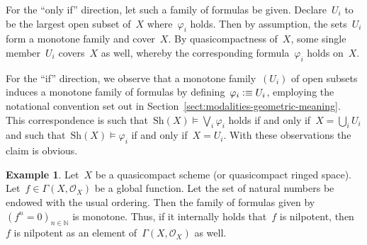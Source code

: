 \documentclass[10pt,reqno,a4paper]{amsbook}
\makeatletter
\theoremstyle{definition}
\newtheorem{ex}[defn]{Example}
\theoremstyle{plain}
\theoremstyle{remark}
\renewcommand{\O}{\mathcal{O}}
\newcommand{\NN}{\mathbb{N}}
\newcommand{\Sh}{\mathrm{Sh}}
\newcommand{\?}{\,{:}\,}
\renewcommand{\_}{\mathpunct{.}\,}
\newcommand{\defequiv}{\vcentcolon\equiv}
\renewenvironment{proof}[1][\proofname]{\par
  \pushQED{\qed}%
  \normalfont \topsep6\p@\@plus6\p@\relax
  \trivlist
  \item[\hskip\labelsep
        \itshape
    #1\@addpunct{.}]\ignorespaces
}{%
  \popQED\endtrivlist\@endpefalse
}
\makeatother
\begin{document}
\begin{proof}For the ``only if'' direction, let such a family of formulas be
given. Declare~$U_i$ to be the largest open subset of~$X$ where~$\varphi_i$
holds. Then by assumption, the sets~$U_i$ form a monotone family and cover~$X$. By
quasicompactness of~$X$, some single member~$U_i$ covers~$X$ as well, whereby the
corresponding formula~$\varphi_i$ holds on~$X$.

For the ``if'' direction, we observe that a monotone family~$(U_i)$ of open subsets
induces a monotone family of formulas by defining~$\varphi_i \defequiv U_i$,
employing the notational convention set out in
Section~\ref{sect:modalities-geometric-meaning}. This
correspondence is such that~$\Sh(X) \models \bigvee_i \varphi_i$ holds if and
only if~$X = \bigcup_i U_i$ and such that~$\Sh(X) \models \varphi_i$ if and
only if~$X = U_i$. With these observations the claim is obvious.
\end{proof}

\begin{ex}\label{ex:nilpotency-directed}
Let~$X$ be a quasicompact scheme (or quasicompact ringed space).
Let~$f \in \Gamma(X,\O_X)$ be a global function. Let the set of natural
numbers be endowed with the usual ordering. Then the family of formulas given by~$(f^n =
0)_{n \in \NN}$ is monotone. Thus, if it internally holds that~$f$ is
nilpotent, then~$f$ is nilpotent as an element of~$\Gamma(X,\O_X)$ as
well.\end{ex}
\end{document}
